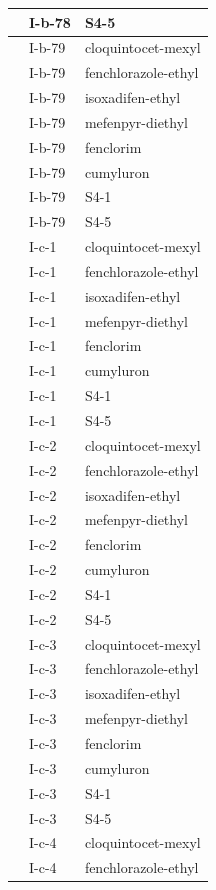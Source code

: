\documentclass[11pt,a4paper]{article}
\begin{document}
\begin{table}[h]
\begin{tabular}{|l|l|l|}
 & I-b-78 & S4-5 \\ \hline
 & I-b-79 & cloquintocet-mexyl \\ \hline
 & I-b-79 & fenchlorazole-ethyl \\ \hline
 & I-b-79 & isoxadifen-ethyl \\ \hline
 & I-b-79 & mefenpyr-diethyl \\ \hline
 & I-b-79 & fenclorim \\ \hline
 & I-b-79 & cumyluron \\ \hline
 & I-b-79 & S4-1 \\ \hline
 & I-b-79 & S4-5 \\ \hline
 & I-c-1 & cloquintocet-mexyl \\ \hline
 & I-c-1 & fenchlorazole-ethyl \\ \hline
 & I-c-1 & isoxadifen-ethyl \\ \hline
 & I-c-1 & mefenpyr-diethyl \\ \hline
 & I-c-1 & fenclorim \\ \hline
 & I-c-1 & cumyluron \\ \hline
 & I-c-1 & S4-1 \\ \hline
 & I-c-1 & S4-5 \\ \hline
 & I-c-2 & cloquintocet-mexyl \\ \hline
 & I-c-2 & fenchlorazole-ethyl \\ \hline
 & I-c-2 & isoxadifen-ethyl \\ \hline
 & I-c-2 & mefenpyr-diethyl \\ \hline
 & I-c-2 & fenclorim \\ \hline
 & I-c-2 & cumyluron \\ \hline
 & I-c-2 & S4-1 \\ \hline
 & I-c-2 & S4-5 \\ \hline
 & I-c-3 & cloquintocet-mexyl \\ \hline
 & I-c-3 & fenchlorazole-ethyl \\ \hline
 & I-c-3 & isoxadifen-ethyl \\ \hline
 & I-c-3 & mefenpyr-diethyl \\ \hline
 & I-c-3 & fenclorim \\ \hline
 & I-c-3 & cumyluron \\ \hline
 & I-c-3 & S4-1 \\ \hline
 & I-c-3 & S4-5 \\ \hline
 & I-c-4 & cloquintocet-mexyl \\ \hline
 & I-c-4 & fenchlorazole-ethyl \\ \hline

\end{tabular}
\end{table}
\end{document}
